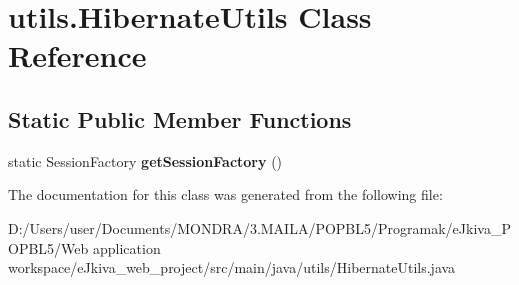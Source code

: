 \hypertarget{classutils_1_1_hibernate_utils}{}\section{utils.\+Hibernate\+Utils Class Reference}
\label{classutils_1_1_hibernate_utils}
\subsection*{Static Public Member Functions}
\begin{DoxyCompactItemize}
\item 
\mbox{\label{classutils_1_1_hibernate_utils_a48f212775a4d87ceb1116c11f05d4053}} 
static Session\+Factory {\bfseries get\+Session\+Factory} ()
\end{DoxyCompactItemize}


The documentation for this class was generated from the following file\+:\begin{DoxyCompactItemize}
\item 
D\+:/\+Users/user/\+Documents/\+M\+O\+N\+D\+R\+A/3.\+M\+A\+I\+L\+A/\+P\+O\+P\+B\+L5/\+Programak/e\+Jkiva\+\_\+\+P\+O\+P\+B\+L5/\+Web application workspace/e\+Jkiva\+\_\+web\+\_\+project/src/main/java/utils/Hibernate\+Utils.\+java\end{DoxyCompactItemize}

